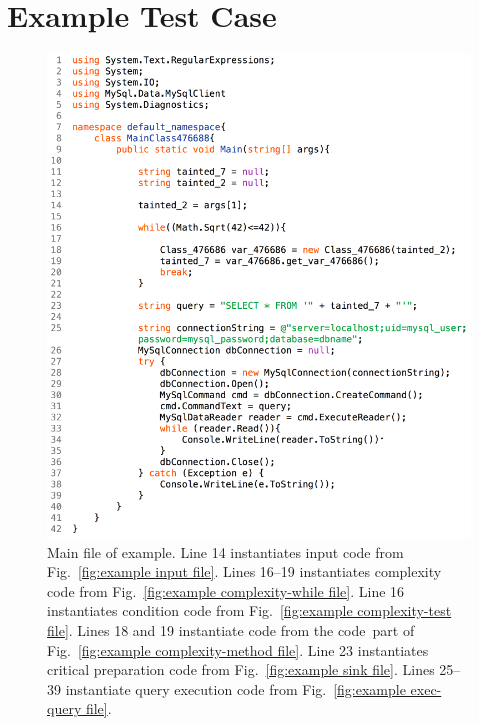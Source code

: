\documentclass[12pt]{article}
\begin{document}
\section{Example Test Case}
\label{sec:generated files}

\begin{figure}[htbp]
  \includegraphics[width=\linewidth]{fig_example_code1.png}
  \caption{Main file of example. Line 14 instantiates input code from 
    Fig.~\ref{fig:example input file}. Lines 16--19 instantiates complexity code from 
    Fig.~\ref{fig:example complexity-while file}. Line 16 instantiates condition code from
    Fig.~\ref{fig:example complexity-test file}.  Lines 18 and 19 instantiate code from the
    \texlangle code\texrangle\  part of Fig.~\ref{fig:example complexity-method file}.
    Line 23 instantiates critical preparation code from Fig.~\ref{fig:example sink file}.
    Lines 25--39 instantiate query execution code from Fig.~\ref{fig:example exec-query file}.
  }
  \label{fig:example main file}
\end{figure}
\end{document}
